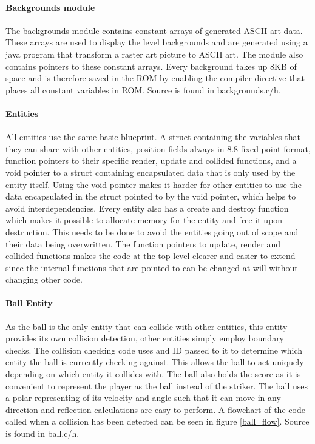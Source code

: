 \paragraph{Backgrounds module}
The backgrounds module contains constant arrays of generated ASCII art data. These arrays are used
to display the level backgrounds and are generated using a java program that transform a raster
art picture to ASCII art. The module also contains pointers to these constant arrays. Every
background takes up 8KB of space and is therefore saved in the ROM by enabling the compiler
directive that places all constant variables in ROM. Source is found in backgrounds.c/h.

\paragraph{Entities}
All entities use the same basic blueprint. A struct containing the variables that they can share
with other entities, position fields always in 8.8 fixed point format, function pointers
 to their specific render, update and collided functions, and
a void pointer to a struct containing encapsulated data that is only used by the entity itself. 
Using the void pointer makes it harder for other entities to use the data encapsulated in the
struct pointed to by the void pointer, which helps to avoid interdependencies. Every entity also
has a create and destroy function which makes it possible to allocate memory for the entity
and free it upon destruction. This needs to be done to avoid the entities going out of scope
and their data being overwritten. The function pointers to update, render and collided functions
makes the code at the top level clearer and easier to extend since the internal functions that
are pointed to can be changed at will without changing other code.

\paragraph{Ball Entity}
As the ball is the only entity that can collide with other entities, this entity provides its own 
collision detection, other entities simply employ boundary checks. The collision checking code
uses and ID passed to it to determine which entity the ball is currently checking against.
This allows the ball to act uniquely depending on which entity it collides with.
 The ball also holds the score
as it is convenient to represent the player as the ball instead of the striker. The ball
uses a polar representing of its velocity and angle such that it can move in any direction
and reflection calculations are easy to perform. A flowchart of the
 code called when a collision has been detected can be seen in figure \ref{ball_flow}.
Source is found in ball.c/h.

